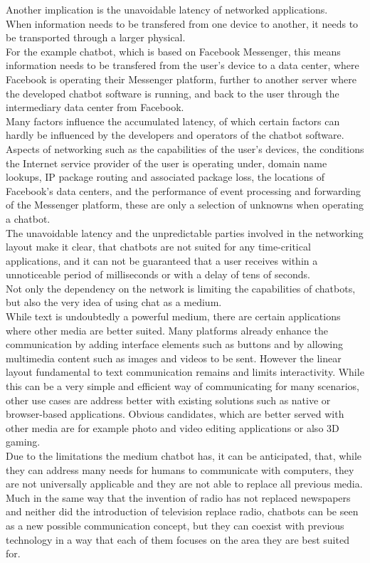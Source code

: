 Another implication is the unavoidable latency of networked applications.
\\
When information needs to be transfered from one device to another,
it needs to be transported through a larger physical.
\\
For the example chatbot, which is based on Facebook Messenger,
this means information needs to be transfered from the user's device to a data center,
where Facebook is operating their Messenger platform,
further to another server where the developed chatbot software is running,
and back to the user through the intermediary data center from Facebook.
\\
Many factors influence the accumulated latency,
of which certain factors can hardly be influenced by the developers and operators of the chatbot software.
\\
Aspects of networking such as the capabilities of the user's devices,
the conditions the Internet service provider of the user is operating under,
domain name lookups,
IP package routing and associated package loss,
the locations of Facebook's data centers,
and the performance of event processing and forwarding of the Messenger platform,
these are only a selection of unknowns when operating a chatbot.
\\
The unavoidable latency and the unpredictable parties involved in the networking layout
make it clear, that chatbots are not suited for any time-critical applications,
and it can not be guaranteed that a user receives within a unnoticeable period of milliseconds or with a delay of tens of seconds.
\\

Not only the dependency on the network is limiting the capabilities of chatbots,
but also the very idea of using chat as a medium.
\\
While text is undoubtedly a powerful medium,
there are certain applications where other media are better suited.
Many platforms already enhance the communication by adding interface elements such as buttons
and by allowing multimedia content such as images and videos to be sent.
However the linear layout fundamental to text communication remains and limits interactivity.
While this can be a very simple and efficient way of communicating for many scenarios,
other use cases are address better with existing solutions such as native or browser-based applications.
Obvious candidates, which are better served with other media are for example photo and video editing applications
or also 3D gaming.
\\

Due to the limitations the medium chatbot has, it can be anticipated,
that, while they can address many needs for humans to communicate with computers,
they are not universally applicable and they are not able to replace all previous media.
\\
Much in the same way that the invention of radio has not replaced newspapers
and neither did the introduction of television replace radio,
chatbots can be seen as a new possible communication concept,
but they can coexist with previous technology in a way that each of them focuses on the area they are best suited for.
